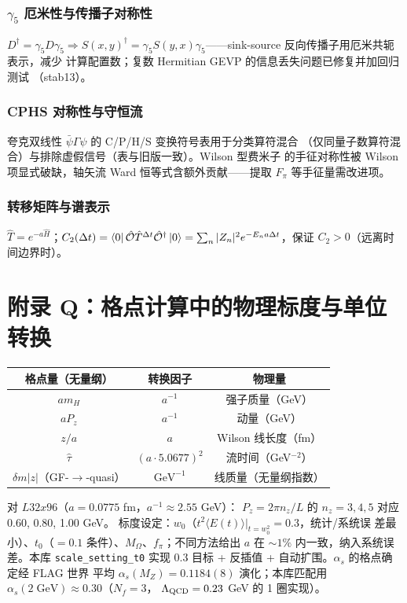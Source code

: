\documentclass[11pt,a4paper]{ctexart}
\newcommand{\abs}[1]{\lvert #1\rvert}
\newcommand{\code}[1]{\texttt{#1}}
\newcommand{\zzh}{\widehat{\tau}}
\begin{document}
\subsubsection{$\gamma_5$ 厄米性与传播子对称性}

$D^\dagger=\gamma_5D\gamma_5\Rightarrow S(x,y)^\dagger
=\gamma_5S(y,x)\gamma_5$——sink-source 反向传播子用厄米共轭表示，减少
计算配置数；复数 Hermitian GEVP 的信息丢失问题已修复并加回归测试
（stab13）。

\subsubsection{CPHS 对称性与守恒流}

夸克双线性 $\bar\psi\Gamma\psi$ 的 C/P/H/S 变换符号表用于分类算符混合
（仅同量子数算符混合）与排除虚假信号（表与旧版一致）。Wilson 型费米子
的手征对称性被 Wilson 项显式破缺，轴矢流 Ward 恒等式含额外贡献——提取
$F_\pi$ 等手征量需改进项。

\subsubsection{转移矩阵与谱表示}

$\hat T=e^{-a\hat H}$；$C_2(\Delta t)=\bra0\hat{\mathcal O}\hat T^{\Delta t}
\hat{\mathcal O}^\dagger\ket0=\sum_n|Z_n|^2e^{-E_n a\Delta t}$，保证
$C_2>0$（远离时间边界时）。

\section{附录 Q：格点计算中的物理标度与单位转换}

\begin{center}
\begin{tabular}{c c c}
\toprule
\textbf{格点量（无量纲）} & \textbf{转换因子} & \textbf{物理量} \\
\midrule
$am_H$ & $a^{-1}$ & 强子质量（GeV） \\
$aP_z$ & $a^{-1}$ & 动量（GeV） \\
$z/a$ & $a$ & Wilson 线长度（fm） \\
$\zzh$ & $(a\cdot5.0677)^2$ & 流时间（GeV$^{-2}$） \\
$\delta m\abs z$（GF-$\to$-quasi） & $\mathrm{GeV}^{-1}$ & 线质量（无量纲指数） \\
\bottomrule
\end{tabular}
\end{center}
对 $L32x96$（$a=0.0775$ fm，$a^{-1}\approx2.55$ GeV）：
$P_z=2\pi n_z/L$ 的 $n_z=3,4,5$ 对应 0.60, 0.80, 1.00 GeV。
标度设定：$w_0$（$t^2\langle E(t)\rangle|_{t=w_0^2}=0.3$，统计/系统误
差最小）、$t_0$（$=0.1$ 条件）、$M_\Omega$、$f_\pi$；不同方法给出
$a$ 在 $\sim1\%$ 内一致，纳入系统误差。本库 \code{scale\_setting\_t0}
实现 0.3 目标 + 反插值 + 自动扩围。$\alpha_s$ 的格点确定经 FLAG 世界
平均 $\alpha_s(M_Z)=0.1184(8)$ 演化；本库匹配用
$\alpha_s(2\;\mathrm{GeV})\approx0.30$（$N_f=3$，
$\Lambda_{\rm QCD}=0.23$ GeV 的 1 圈实现）。
\end{document}
